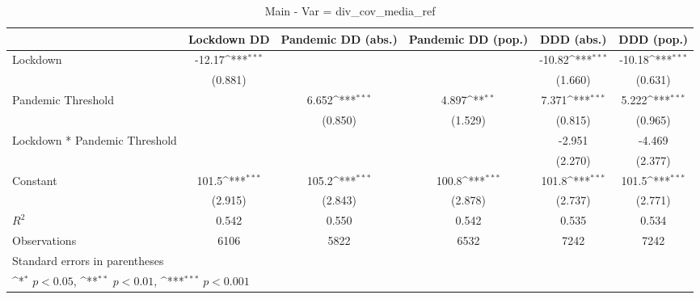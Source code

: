 \documentclass{article}
\begin{document}
{
\def\sym#1{\ifmmode^{#1}\else\(^{#1}\)\fi}
\begin{longtable}{l*{5}{c}}
\caption{Main - Var = div\_cov\_media\_ref}\\
\hline\hline\endfirsthead\hline\endhead\hline\endfoot\endlastfoot
                &\multicolumn{1}{c}{Lockdown DD}&\multicolumn{1}{c}{Pandemic DD (abs.)}&\multicolumn{1}{c}{Pandemic DD (pop.)}&\multicolumn{1}{c}{DDD (abs.)}&\multicolumn{1}{c}{DDD (pop.)}\\
\hline
Lockdown        &   -12.17\sym{***}&                  &                  &   -10.82\sym{***}&   -10.18\sym{***}\\
                &  (0.881)         &                  &                  &  (1.660)         &  (0.631)         \\
Pandemic Threshold&                  &    6.652\sym{***}&    4.897\sym{**} &    7.371\sym{***}&    5.222\sym{***}\\
                &                  &  (0.850)         &  (1.529)         &  (0.815)         &  (0.965)         \\
Lockdown * Pandemic Threshold&                  &                  &                  &   -2.951         &   -4.469         \\
                &                  &                  &                  &  (2.270)         &  (2.377)         \\
Constant        &    101.5\sym{***}&    105.2\sym{***}&    100.8\sym{***}&    101.8\sym{***}&    101.5\sym{***}\\
                &  (2.915)         &  (2.843)         &  (2.878)         &  (2.737)         &  (2.771)         \\
\hline
\(R^{2}\)       &    0.542         &    0.550         &    0.542         &    0.535         &    0.534         \\
Observations    &     6106         &     5822         &     6532         &     7242         &     7242         \\
\hline\hline
\multicolumn{6}{l}{\footnotesize Standard errors in parentheses}\\
\multicolumn{6}{l}{\footnotesize \sym{*} \(p<0.05\), \sym{**} \(p<0.01\), \sym{***} \(p<0.001\)}\\
\end{longtable}
}
\end{document}
